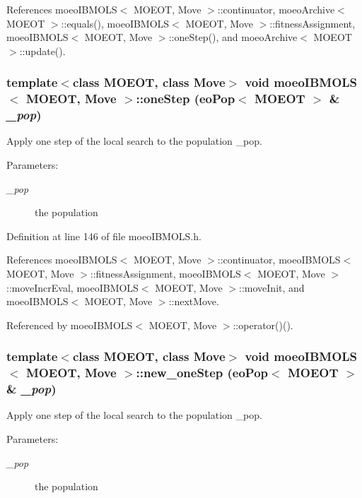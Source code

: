 References moeo\-IBMOLS$<$ MOEOT, Move $>$::continuator, moeo\-Archive$<$ MOEOT $>$::equals(), moeo\-IBMOLS$<$ MOEOT, Move $>$::fitness\-Assignment, moeo\-IBMOLS$<$ MOEOT, Move $>$::one\-Step(), and moeo\-Archive$<$ MOEOT $>$::update().
\subsubsection{\setlength{\rightskip}{0pt plus 5cm}template$<$class MOEOT, class Move$>$ void \bf{moeo\-IBMOLS}$<$ MOEOT, Move $>$::one\-Step (eo\-Pop$<$ MOEOT $>$ \& {\em \_\-pop})\hspace{0.3cm}{\tt  [inline, private]}}\label{classmoeoIBMOLS_fce770398602972b5d67c52638687d43}


Apply one step of the local search to the population \_\-pop. 

\begin{Desc}
\item[Parameters:]
\begin{description}
\item[{\em \_\-pop}]the population \end{description}
\end{Desc}


Definition at line 146 of file moeo\-IBMOLS.h.

References moeo\-IBMOLS$<$ MOEOT, Move $>$::continuator, moeo\-IBMOLS$<$ MOEOT, Move $>$::fitness\-Assignment, moeo\-IBMOLS$<$ MOEOT, Move $>$::move\-Incr\-Eval, moeo\-IBMOLS$<$ MOEOT, Move $>$::move\-Init, and moeo\-IBMOLS$<$ MOEOT, Move $>$::next\-Move.

Referenced by moeo\-IBMOLS$<$ MOEOT, Move $>$::operator()().
\subsubsection{\setlength{\rightskip}{0pt plus 5cm}template$<$class MOEOT, class Move$>$ void \bf{moeo\-IBMOLS}$<$ MOEOT, Move $>$::new\_\-one\-Step (eo\-Pop$<$ MOEOT $>$ \& {\em \_\-pop})\hspace{0.3cm}{\tt  [inline, private]}}\label{classmoeoIBMOLS_9d811733d8e7508a7c48615c8ff0f990}


Apply one step of the local search to the population \_\-pop. 

\begin{Desc}
\item[Parameters:]
\begin{description}
\item[{\em \_\-pop}]the population \end{description}
\end{Desc}


